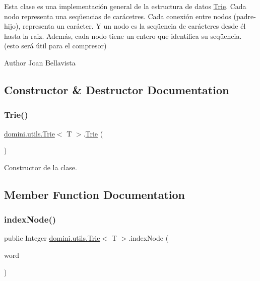 Esta clase es una implementación general de la estructura de datos \hyperlink{classdomini_1_1utils_1_1Trie}{Trie}. Cada nodo representa una seqüencias de carácetres. Cada conexión entre nodos (padre-\/hijo), representa un carácter. Y un nodo es la seqüencia de carácteres desde él hasta la raiz. Además, cada nodo tiene un entero que identifica su seqüencia. (esto será útil para el compresor)

\begin{DoxyAuthor}{Author}
Joan Bellavista 
\end{DoxyAuthor}


\subsection{Constructor \& Destructor Documentation}
\mbox{\label{classdomini_1_1utils_1_1Trie_aa47b21b235e9dab115f3f97726837d5f}} 
\subsubsection{\texorpdfstring{Trie()}{Trie()}}
{\footnotesize\ttfamily \hyperlink{classdomini_1_1utils_1_1Trie}{domini.\+utils.\+Trie}$<$ T $>$.\hyperlink{classdomini_1_1utils_1_1Trie}{Trie} (\begin{DoxyParamCaption}{ }\end{DoxyParamCaption})\hspace{0.3cm}{\ttfamily [inline]}}



Constructor de la clase. 



\subsection{Member Function Documentation}
\mbox{\label{classdomini_1_1utils_1_1Trie_a5c30e36df9ab804bbc054805358ecf2a}} 
\subsubsection{\texorpdfstring{index\+Node()}{indexNode()}}
{\footnotesize\ttfamily public Integer \hyperlink{classdomini_1_1utils_1_1Trie}{domini.\+utils.\+Trie}$<$ T $>$.index\+Node (\begin{DoxyParamCaption}\item[{Array\+List$<$ T $>$}]{word }\end{DoxyParamCaption})\hspace{0.3cm}{\ttfamily [inline]}}



